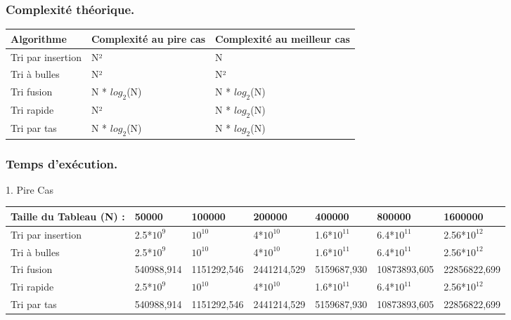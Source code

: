 \documentclass[12pt]{article}
\begin{document}
\subsubsection{Complexité théorique.}
\begin{tabular}{|p{4cm}||p{4cm}|p{4cm}|}
\hline

Algorithme & Complexité au pire cas & Complexité au meilleur cas\\
\hline
Tri par insertion  & N² & N    \\
\hline
Tri à bulles  & N² & N² \\
\hline
Tri fusion  & N * $log_{2}$(N) & N * $log_{2}$(N) \\
\hline
Tri rapide & N² & N * $log_{2}$(N) \\
\hline
Tri par tas & N * $log_{2}$(N) & N * $log_{2}$(N) \\
\hline

\end{tabular}

\subsubsection{Temps d'exécution.}

1. Pire Cas\\

\begin{tabular}{|p{3cm}||p{2cm}|p{2cm}|p{2cm}|p{2cm}|p{2cm}|p{2cm}|}
\hline
Taille du Tableau (N) : & 50000 & 100000 & 200000 & 400000 & 800000  & 1600000\\
\hline
Tri par insertion  & 2.5*$10^{9}$ & $10^{10}$ & 4*$10^{10}$ & 1.6*$10^{11}$ & 6.4*$10^{11}$ & 2.56*$10^{12}$  \\
\hline
Tri à bulles  & 2.5*$10^{9}$ & $10^{10}$ & 4*$10^{10}$ & 1.6*$10^{11}$ & 6.4*$10^{11}$ & 2.56*$10^{12}$  \\
\hline
Tri fusion  & 540988,914 & 1151292,546 & 2441214,529 & 5159687,930 & 10873893,605 &  22856822,699\\
\hline
Tri rapide & 2.5*$10^{9}$ & $10^{10}$ & 4*$10^{10}$ & 1.6*$10^{11}$ & 6.4*$10^{11}$ & 2.56*$10^{12}$  \\
\hline
Tri par tas & 540988,914 & 1151292,546 & 2441214,529 & 5159687,930 & 10873893,605 &  22856822,699\\
\hline
\end{tabular}
\end{document}
